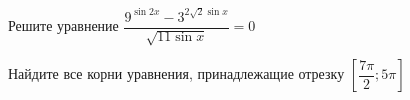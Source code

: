 \begin{ex}
	\begin{condition}
		\begin{enumcols}[label=\asbuk*)]
			\item Решите уравнение \( \dfrac{9^{\sin 2x} - 3^{2\sqrt{2}\sin x}}{\sqrt{11\sin x}} = 0 \)
			\item Найдите все корни уравнения, принадлежащие отрезку \( \left[\dfrac{7\pi}{2};5\pi\right] \)
		\end{enumcols}
	\end{condition}
\end{ex}